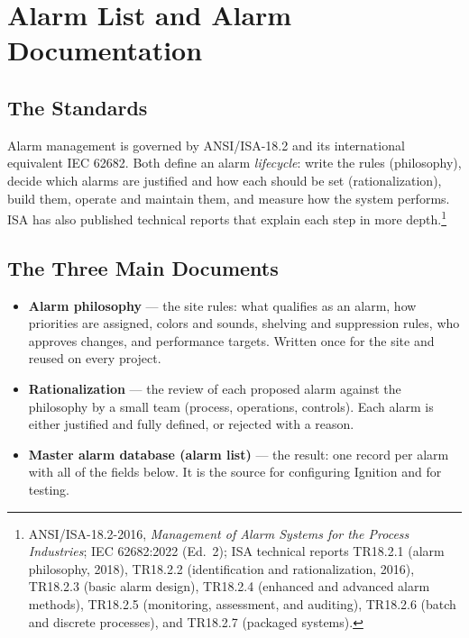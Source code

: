 \chapter{Alarm List and Alarm Documentation}
\label{app:alarm-doc}

\section{The Standards}
Alarm management is governed by ANSI/ISA-18.2 and its international equivalent IEC 62682. Both define an alarm \emph{lifecycle}: write the rules (philosophy), decide which alarms are justified and how each should be set (rationalization), build them, operate and maintain them, and measure how the system performs. ISA has also published technical reports that explain each step in more depth.\footnote{ANSI/ISA-18.2-2016, \emph{Management of Alarm Systems for the Process Industries}; IEC 62682:2022 (Ed.~2); ISA technical reports TR18.2.1 (alarm philosophy, 2018), TR18.2.2 (identification and rationalization, 2016), TR18.2.3 (basic alarm design), TR18.2.4 (enhanced and advanced alarm methods), TR18.2.5 (monitoring, assessment, and auditing), TR18.2.6 (batch and discrete processes), and TR18.2.7 (packaged systems).}

\section{The Three Main Documents}
\begin{itemize}[itemsep=2pt]
  \item \textbf{Alarm philosophy} --- the site rules: what qualifies as an alarm, how priorities are assigned, colors and sounds, shelving and suppression rules, who approves changes, and performance targets. Written once for the site and reused on every project.
  \item \textbf{Rationalization} --- the review of each proposed alarm against the philosophy by a small team (process, operations, controls). Each alarm is either justified and fully defined, or rejected with a reason.
  \item \textbf{Master alarm database (alarm list)} --- the result: one record per alarm with all of the fields below. It is the source for configuring Ignition and for testing.
\end{itemize}

